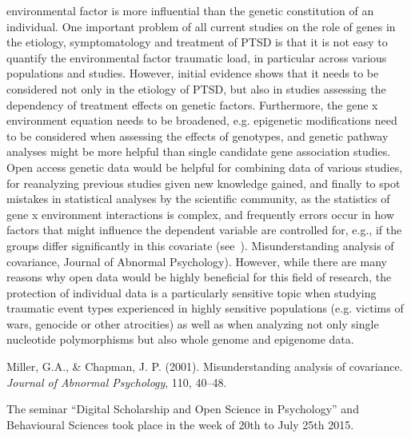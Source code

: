 \documentclass[a4paper,USenglish]{dagrep}
\begin{document}
environmental factor is more influential than the genetic constitution of an
individual. One important problem of all current studies on the role of genes in
the etiology, symptomatology and treatment of PTSD is that it is not easy to
quantify the environmental factor traumatic load, in particular across various
populations and studies. However, initial evidence shows that it needs to be
considered not only in the etiology of PTSD, but also in studies assessing the
dependency of treatment effects on genetic factors. Furthermore, the gene x
environment equation needs to be broadened, e.g. epigenetic modifications need
to be considered when assessing the effects of genotypes, and genetic pathway
analyses might be more helpful than single candidate gene association studies. 
Open access genetic data would be helpful for combining data of various studies,
for reanalyzing previous studies given new knowledge gained, and finally to spot
mistakes in statistical analyses by the scientific community, as the statistics
of gene x environment interactions is complex, and frequently errors occur in
how factors that might influence the dependent variable are controlled for,
e.g., if the groups differ significantly in this covariate (see~\cite{MillerChapman}).  Misunderstanding analysis of covariance, Journal of Abnormal
Psychology). However, while there are many reasons why open data would be highly
beneficial for this field of research, the protection of individual data is a
particularly sensitive topic when studying traumatic event types experienced in
highly sensitive populations (e.g. victims of wars, genocide or other
atrocities) as well as when analyzing not only single nucleotide polymorphisms
but also whole genome and epigenome data. 

\begin{thebibliography}{0}
Miller, G.A., \& Chapman, J. P. (2001). Misunderstanding analysis of covariance.  \textit{Journal of Abnormal Psychology}, 110, 40–48.
\end{thebibliography}
  


{}
\license
{}
The seminar ``Digital Scholarship and Open Science in Psychology'' and 
Behavioural Sciences took place in the week of 20th to July 25th 2015.
\end{document}
